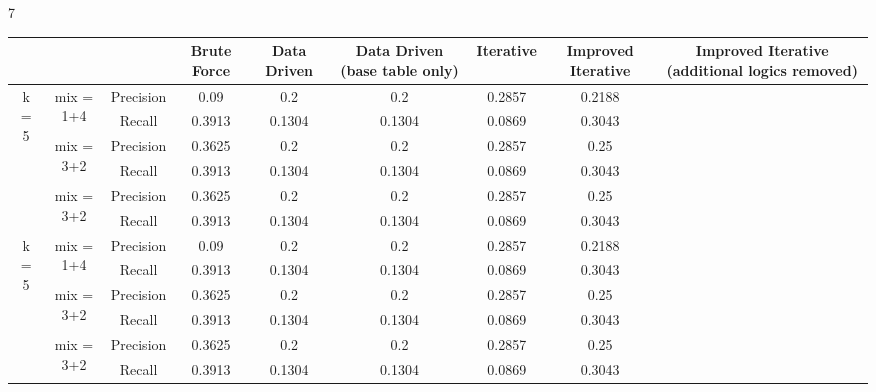 \begin{table}[h!]
    7\scriptsize
    \begin{center}
\begin{tabular*}{\textwidth}{c @{\extracolsep{\fill}} cccccccc}
    \hline
    & & & \textbf{Brute Force} & \textbf{Data Driven} & \textbf{Data Driven (base table only)} & \textbf{Iterative} & \textbf{Improved Iterative} & \textbf{Improved Iterative (additional logics removed)}\\
    \hline
    \multirow{6}{*}{k = 5} & \multirow{2}{*}{mix = 1+4} & Precision & 0.09 & 0.2 & 0.2 & 0.2857 & 0.2188 & \\
    \cline{3-9}
    & & Recall & 0.3913 & 0.1304 & 0.1304 & 0.0869 & 0.3043 & \\
    \cline{2-9}
    & \multirow{2}{*}{mix = 3+2} & Precision & 0.3625 & 0.2 &  0.2 & 0.2857 & 0.25 & \\
    \cline{3-9}
    & & Recall & 0.3913 & 0.1304 & 0.1304 & 0.0869 & 0.3043 & \\
    \cline{2-9}
    & \multirow{2}{*}{mix = 3+2} & Precision & 0.3625 & 0.2 &  0.2 & 0.2857 & 0.25 & \\
    \cline{3-9}
    & & Recall & 0.3913 & 0.1304 & 0.1304 & 0.0869 & 0.3043 & \\
    \hline        
    \multirow{6}{*}{k = 5} & \multirow{2}{*}{mix = 1+4} & Precision & 0.09 & 0.2 & 0.2 & 0.2857 & 0.2188 & \\
    \cline{3-9}
    & & Recall & 0.3913 & 0.1304 & 0.1304 & 0.0869 & 0.3043 & \\
    \cline{2-9}
    & \multirow{2}{*}{mix = 3+2} & Precision & 0.3625 & 0.2 &  0.2 & 0.2857 & 0.25 & \\
    \cline{3-9}
    & & Recall & 0.3913 & 0.1304 & 0.1304 & 0.0869 & 0.3043 & \\
    \cline{2-9}
    & \multirow{2}{*}{mix = 3+2} & Precision & 0.3625 & 0.2 &  0.2 & 0.2857 & 0.25 & \\
    \cline{3-9}
    & & Recall & 0.3913 & 0.1304 & 0.1304 & 0.0869 & 0.3043 & \\
    \hline    
\end{tabular*}
    \end{center}
\end{table}

